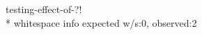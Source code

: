 \documentclass{article}
\begin{document}
testing-effect-of-?!\\*
whitespace info expected w/s:0, observed:2
\end{document}
